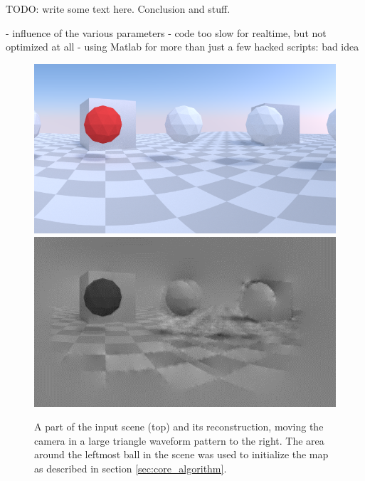TODO: write some text here. Conclusion and stuff.

- influence of the various parameters
- code too slow for realtime, but not optimized at all
- using Matlab for more than just a few hacked scripts: bad idea

\begin{figure}
\includegraphics[width=\columnwidth]{images/zigzag_input.png}
\includegraphics[width=\columnwidth]{images/zigzag_reconstruction.png}
\caption{A part of the input scene (top) and its reconstruction,
moving the camera in a large triangle waveform pattern to the right.
The area around the leftmost ball in the scene was used to initialize
the map as described in section \ref{sec:core_algorithm}.}
\label{fig:zigzag_reconstruction}
\end{figure}
